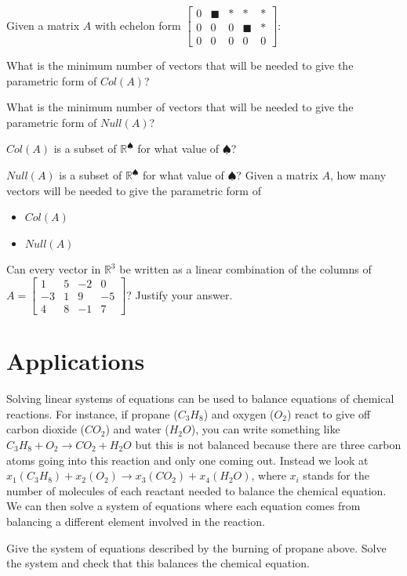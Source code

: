 \bq Given a matrix $A$ with echelon form $\begin{bmatrix} 0&\blacksquare&*&*&*\\0&0&0&\blacksquare&* \\ 0&0&0&0&0 \end{bmatrix}$:
\be
\item What is the minimum number of vectors that will be needed to give the parametric form of $Col(A)$?
\item What is the minimum number of vectors that will be needed to give the parametric form of $Null(A)$?
\item $Col(A)$ is a subset of $\mathbb{R}^\spadesuit$ for what value of $\spadesuit$?
\item $Null(A)$ is a subset of $\mathbb{R}^\spadesuit$ for what value of $\spadesuit$?
\ee
\eq
\bq\label{q10} Given a matrix $A$, how many vectors will be needed to give the parametric form of
\begin{itemize}
\item $Col(A)$
\item $Null(A)$
\end{itemize}
\eq
\bq Can every vector in $\mathbb{R}^3$ be written as a linear combination of the columns of $A = \begin{bmatrix} 1&5&-2&0 \\ -3&1&9&-5 \\ 4&8&-1&7 \end{bmatrix}$? Justify your answer.
\eq

\section{Applications}
Solving linear systems of equations can be used to balance equations of chemical reactions. For instance, if propane ($C_3H_8$) and oxygen ($O_2$) react to give off carbon dioxide ($CO_2$) and water ($H_2O$), you can write something like $C_3H_8 +O_2 \rightarrow CO_2+H_2O$ but this is not balanced because there are three carbon atoms going into this reaction and only one coming out. Instead we look at $x_1 (C_3H_8) +x_2 (O_2) \rightarrow x_3(CO_2)+x_4(H_2O)$, where $x_i$ stands for the number of molecules of each reactant needed to balance the chemical equation. We can then solve a system of equations where each equation comes from balancing a different element involved in the reaction.

\bq Give the system of equations described by the burning of propane above. Solve the system and check that this balances the chemical equation.
\eq

